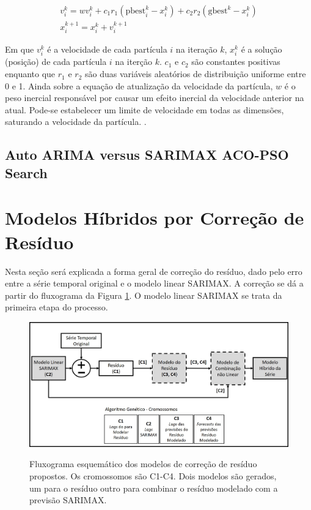 \begin{equation}
\label{eq:pso_vk}
    \begin{gathered}
    v_i^k=wv_i^k+c_1r_1{(\mathrm{pbest}_i^k-x_i^k)}+c_2r_2{(\mathrm{gbest}^k-x_i^k)} \\
    x_i^{k+1}=x_i^k+v_i^{k+1}
    \end{gathered}
\end{equation}

Em que $v_i^k$ é a velocidade de cada partícula $i$ na iteração $k$, $x_i^{k}$ é a solução (posição) de cada partícula $i$ na iterção $k$. $c_1$ e $c_2$ são constantes positivas enquanto que $r_1$ e $r_2$ são duas variáveis aleatórios de distribuição uniforme entre 0 e 1. Ainda sobre a equação de atualização da velocidade da partícula,  $w$ é o peso inercial responsável por causar um efeito inercial da velocidade anterior na atual. Pode-se estabelecer um limite de velocidade em todas as dimensões, saturando a velocidade da partícula. \cite{jaberipour2011particle}.

\subsection{Auto ARIMA versus SARIMAX ACO-PSO Search}


\section{Modelos Híbridos por Correção de Resíduo}

Nesta seção será explicada a forma geral de correção do resíduo, dado pelo erro entre a série temporal original e o modelo linear SARIMAX. A correção se dá a partir do fluxograma da Figura \ref{fig:cap5_fluxograma_cromossomo}. O modelo linear SARIMAX se trata da primeira etapa do processo.

\begin{figure}[htbp]
    \centering
    \caption{Fluxograma esquemático dos modelos de correção de resíduo propostos. Os cromossomos são C1-C4. Dois modelos são gerados, um para o resíduo outro para combinar o resíduo modelado com a previsão SARIMAX.}
    \includegraphics[width=\textwidth]{Figuras/cap5/fluxograma_cromossomos.jpg}
    \label{fig:cap5_fluxograma_cromossomo}
\end{figure}


